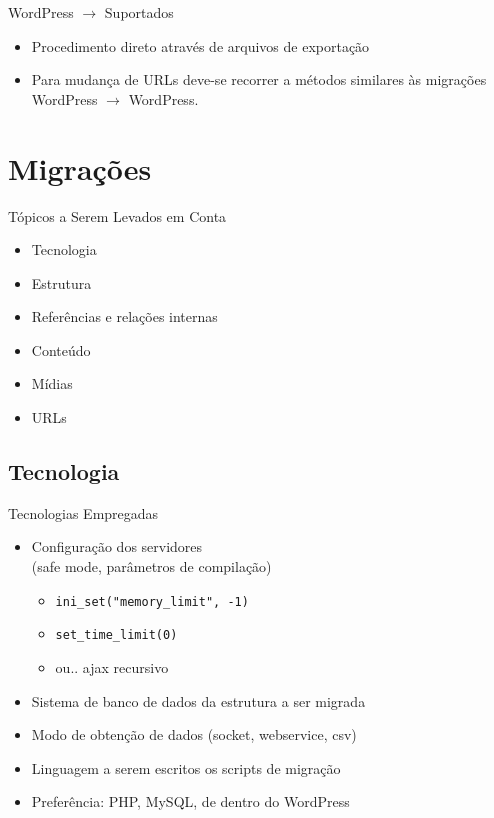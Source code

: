 \documentclass[handout]{beamer}
\begin{document}
\begin{frame}{WordPress $\rightarrow$ Suportados}
\begin{itemize}
  \item Procedimento direto através de arquivos de exportação
  \pause \item Para mudança de URLs deve-se recorrer a métodos
        similares às migrações WordPress $\rightarrow$ WordPress.
\end{itemize}
\end{frame}


\section{Migrações}

\begin{frame}{Tópicos a Serem Levados em Conta}
  \begin{itemize}
    \pause \item Tecnologia
    \pause \item Estrutura
    \pause \item Referências e relações internas
    \pause \item Conteúdo
    \pause \item Mídias
    \pause \item URLs
  \end{itemize}
\end{frame}

\subsection{Tecnologia}

\begin{frame}{Tecnologias Empregadas}
  \begin{itemize}
    \pause \item Configuração dos servidores\pause \\
                 (safe mode, parâmetros de compilação)
    \begin{itemize}
      \pause \item \texttt{ini\_set("memory\_limit", -1)}
      \pause \item \texttt{set\_time\_limit(0)}
      \pause \item ou.. \pause ajax recursivo
    \end{itemize}
    \pause \item Sistema de banco de dados da estrutura a ser migrada
    \pause \item Modo de obtenção de dados (socket, webservice, csv)
    \pause \item Linguagem a serem escritos os scripts de migração
    \pause \item Preferência: \pause PHP\pause, MySQL\pause, de dentro
                 do WordPress
  \end{itemize}
\end{frame}
\end{document}
